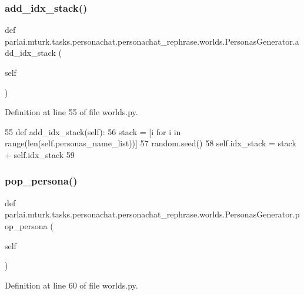\subsubsection{\texorpdfstring{add\+\_\+idx\+\_\+stack()}{add\_idx\_stack()}}
{\footnotesize\ttfamily def parlai.\+mturk.\+tasks.\+personachat.\+personachat\+\_\+rephrase.\+worlds.\+Personas\+Generator.\+add\+\_\+idx\+\_\+stack (\begin{DoxyParamCaption}\item[{}]{self }\end{DoxyParamCaption})}



Definition at line 55 of file worlds.\+py.


\begin{DoxyCode}
55     \textcolor{keyword}{def }add\_idx\_stack(self):
56         stack = [i \textcolor{keywordflow}{for} i \textcolor{keywordflow}{in} range(len(self.personas\_name\_list))]
57         random.seed()
58         self.idx\_stack = stack + self.idx\_stack
59 
\end{DoxyCode}
\mbox{\label{classparlai_1_1mturk_1_1tasks_1_1personachat_1_1personachat__rephrase_1_1worlds_1_1PersonasGenerator_a3af572bb691c40bcbb9df5fe5fdb318d}} 
\subsubsection{\texorpdfstring{pop\+\_\+persona()}{pop\_persona()}}
{\footnotesize\ttfamily def parlai.\+mturk.\+tasks.\+personachat.\+personachat\+\_\+rephrase.\+worlds.\+Personas\+Generator.\+pop\+\_\+persona (\begin{DoxyParamCaption}\item[{}]{self }\end{DoxyParamCaption})}



Definition at line 60 of file worlds.\+py.


